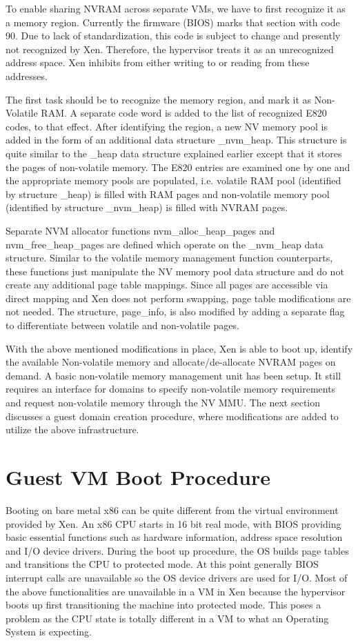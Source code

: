  To enable sharing NVRAM across separate VMs, we have to first recognize it as a memory region. Currently the firmware (BIOS) marks that section with code 90. Due to lack of standardization, this code is subject to change and presently not recognized by Xen. Therefore, the hypervisor treats it as an unrecognized address space. Xen inhibits from either writing to or reading from these addresses.

The first task should be to recognize the memory region, and mark it as Non-Volatile RAM. A separate code word is added to the list of recognized E820 codes, to that effect. After identifying the region, a new NV memory pool is added in the form of an additional data structure \_nvm\_heap. This structure is quite similar to the \_heap data structure explained earlier except that it stores the pages of non-volatile memory. The E820 entries are examined one by one and the appropriate memory pools are populated, i.e. volatile RAM pool (identified by structure \_heap) is filled with RAM pages and non-volatile memory pool (identified by structure \_nvm\_heap) is filled with NVRAM pages.

Separate NVM allocator functions nvm\_alloc\_heap\_pages and nvm\_free\_heap\_pages are defined which operate on the \_nvm\_heap data structure. Similar to the volatile memory management function counterparts, these functions just manipulate the NV memory pool data structure and do not create any additional page table mappings. Since all pages are accessible via direct mapping and Xen does not perform swapping, page table modifications are not needed. The structure, page\_info, is also modified by adding a separate flag to differentiate between volatile and non-volatile pages.

With the above mentioned modifications in place, Xen is able to boot up, identify the available Non-volatile memory and allocate/de-allocate NVRAM pages on demand. A basic non-volatile memory management unit has been setup. It still requires an interface for domains to specify non-volatile memory requirements and request non-volatile memory through the NV MMU. The next section discusses a guest domain creation procedure, where modifications are added to utilize the above infrastructure. 

\section{Guest VM Boot Procedure}

Booting on bare metal x86 can be quite different from the virtual environment provided by Xen. An x86 CPU starts in 16 bit real mode, with BIOS providing basic essential functions such as hardware information, address space resolution and I/O device drivers. During the boot up procedure, the OS builds page tables and transitions the CPU to protected mode. At this point generally BIOS interrupt calls are unavailable so the OS device drivers are used for I/O. Most of the above functionalities are unavailable in a VM in Xen because the hypervisor boots up first transitioning the machine into protected mode. This poses a problem as the CPU state is totally different in a VM to what an Operating System is expecting.

